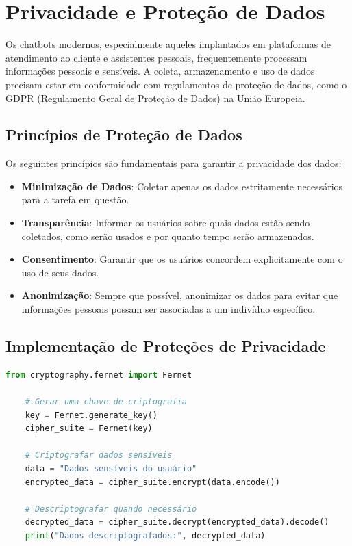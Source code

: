\documentclass[14pt,a4paper,oneside]{book}
\begin{document}
\section{Privacidade e Proteção de Dados}

Os chatbots modernos, especialmente aqueles implantados em plataformas de atendimento ao cliente e assistentes pessoais, frequentemente processam informações pessoais e sensíveis. A coleta, armazenamento e uso de dados precisam estar em conformidade com regulamentos de proteção de dados, como o GDPR (Regulamento Geral de Proteção de Dados) na União Europeia.

\subsection{Princípios de Proteção de Dados}

Os seguintes princípios são fundamentais para garantir a privacidade dos dados:

\begin{itemize}
	\item \textbf{Minimização de Dados}: Coletar apenas os dados estritamente necessários para a tarefa em questão.
	\item \textbf{Transparência}: Informar os usuários sobre quais dados estão sendo coletados, como serão usados e por quanto tempo serão armazenados.
	\item \textbf{Consentimento}: Garantir que os usuários concordem explicitamente com o uso de seus dados.
	\item \textbf{Anonimização}: Sempre que possível, anonimizar os dados para evitar que informações pessoais possam ser associadas a um indivíduo específico.
\end{itemize}

\subsection{Implementação de Proteções de Privacidade}

\begin{lstlisting}[language=Python]
	from cryptography.fernet import Fernet
	
	# Gerar uma chave de criptografia
	key = Fernet.generate_key()
	cipher_suite = Fernet(key)
	
	# Criptografar dados sensíveis
	data = "Dados sensíveis do usuário"
	encrypted_data = cipher_suite.encrypt(data.encode())
	
	# Descriptografar quando necessário
	decrypted_data = cipher_suite.decrypt(encrypted_data).decode()
	print("Dados descriptografados:", decrypted_data)
\end{lstlisting}
\end{document}
